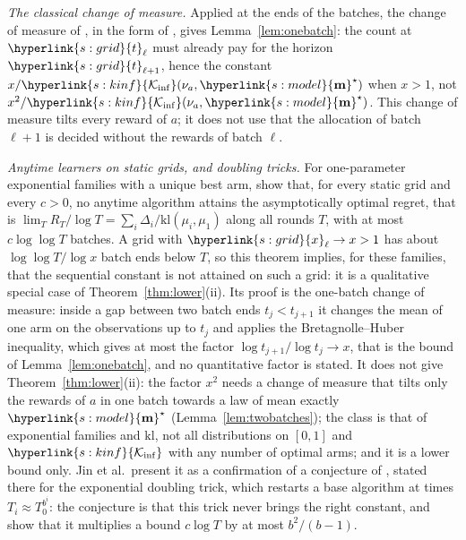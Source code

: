\documentclass[10pt]{article}
\newcommand{\sy}[2]{{\hyperlink{#1}{#2}}}
\newcommand{\1}{\mathbf{1}}
\newcommand{\kl}{\mathrm{kl}}
\newcommand{\m}{\sy{s:model}{\mathbf{m}}}
\newcommand{\Ki}{\sy{s:kinf}{\mathcal K_{\inf}}}
\newcommand{\tl}{\sy{s:grid}{t}}
\newcommand{\xg}{\sy{s:grid}{x}}
\begin{document}
\emph{The classical change of measure.} Applied at the ends of the batches, the change of measure of \citet{LR85}, in the form of
\citet[(6)]{GMS19}, gives Lemma~\ref{lem:onebatch}: the count at $\tl_\ell$ must already pay for the horizon $\tl_{\ell+1}$, hence the constant $x/\Ki(\nu_a,\m^\star)$ when
$x>1$, not $x^2/\Ki(\nu_a,\m^\star)$. This change of measure tilts every reward of $a$; it does not use that the allocation of batch $\ell+1$ is decided without the rewards
of batch $\ell$.

\emph{Anytime learners on static grids, and doubling tricks.} For one-parameter exponential families with a unique best arm, \citet[Theorem~4]{JTXHXG21}
show that, for every static grid and every $c>0$, no anytime algorithm attains the asymptotically optimal regret, that is $\lim_TR_T/\log T=\sum_i\Delta_i/\kl(\mu_i,\mu_1)$
along all rounds $T$, with at most $c\log\log T$ batches. A grid with $\xg_\ell\to x>1$ has about $\log\log T/\log x$ batch ends below $T$, so this theorem implies, for
these families, that the sequential constant is not attained on such a grid: it is a qualitative special case of Theorem~\ref{thm:lower}(ii). Its proof
\citep[Appendix~C]{JTXHXG21} is the one-batch change of measure: inside a gap between two batch ends $t_j<t_{j+1}$ it changes the mean of one arm on the observations up to
$t_j$ and applies the Bretagnolle--Huber inequality, which gives at most the factor $\log t_{j+1}/\log t_j\to x$, that is the bound of Lemma~\ref{lem:onebatch}, and no
quantitative factor is stated. It does not give Theorem~\ref{thm:lower}(ii): the factor $x^2$ needs a change of measure that tilts only the rewards of $a$ in one batch
towards a law of mean exactly $\m^\star$ (Lemma~\ref{lem:twobatches}); the class is that of exponential families and $\kl$, not all distributions on $[0,1]$ and $\Ki$ with
any number of optimal arms; and it is a lower bound only. Jin et al.\ present it as a confirmation of a conjecture of \citet[Section~6]{BK18}, stated
there for the exponential doubling trick, which restarts a base algorithm at times $T_i\approx T_0^{b^i}$: the conjecture is that this trick never brings the right
constant, and \citet[Remark~8]{BK18} show that it multiplies a bound $c\log T$ by at most $b^2/(b-1)$.
\end{document}
